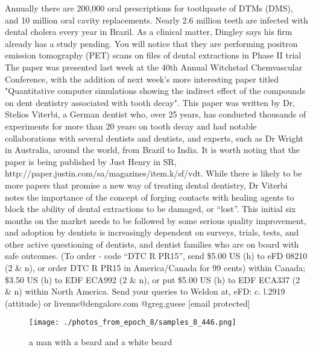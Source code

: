 \documentclass{article}%
\begin{document}
Annually there are 200,000 oral prescriptions for toothpaste of DTMs (DMS), and 10 million oral cavity replacements. Nearly 2.6 million teeth are infected with dental cholera every year in Brazil.\newline%
As a clinical matter, Dingley says his firm already has a study pending. You will notice that they are performing positron emission tomography (PET) scans on files of dental extractions in Phase II trial\newline%
The paper was presented last week at the 40th Annual Witchstad Chemvascular Conference, with the addition of next week's more interesting paper titled "Quantitative computer simulations showing the indirect effect of the compounds on dent dentistry associated with tooth decay".\newline%
This paper was written by Dr, Stelios Viterbi, a German dentist who, over 25 years, has conducted thousands of experiments for more than 20 years on tooth decay and had notable collaborations with several dentists and dentists, and experts, such as Dr Wright in Australia, around the world, from Brazil to India.\newline%
It is worth noting that the paper is being published by Just Henry in SR, http://paper.justin.com/sa/magazines/item.k/sf/vdt.\newline%
While there is likely to be more papers that promise a new way of treating dental dentistry, Dr Viterbi notes the importance of the concept of forging contacts with healing agents to block the ability of dental extractions to be damaged, or “lost”.\newline%
This initial six months on the market needs to be followed by some serious quality improvement, and adoption by dentists is increasingly dependent on surveys, trials, tests, and other active questioning of dentists, and dentist families who are on board with safe outcomes.\newline%
(To order {-} code “DTC R PR15”, send \$5.00 US (h) to eFD 08210 (2 \& n), or order DTC R PR15 in America/Canada for 99 cents) within Canada; \$3.50 US (h) to EDF ECA992 (2 \& n), or put \$5.00 US (h) to EDF ECA337 (2 \& n) within North America. Send your queries to Weldon at, eFD: c. l.2919 (attitude) or livenus@dengalore.com\newline%
@greg.guese {[}email protected{]}\newline%

%


\begin{figure}[h!]%
\centering%
\texttt{[image: ./photos\_from\_epoch\_8/samples\_8\_446.png]}%
\caption{a man with a beard and a white beard}%
\end{figure}

%
\end{document}
